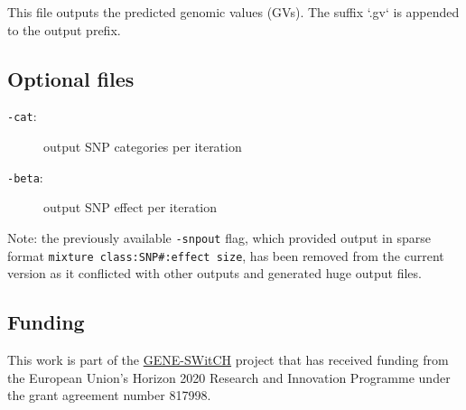 \documentclass{ol-softwaremanual}
\begin{document}
This file outputs the predicted genomic values (GVs). The suffix ‘.gv‘ is appended to the output prefix.

\subsection{Optional files}

\begin{description}
    \item[\texttt{-cat}:] output SNP categories per iteration 
    \item[\texttt{-beta}:] output SNP effect per iteration
\end{description}

Note: the previously available \texttt{-snpout} flag, which provided output in sparse format \texttt{mixture class:SNP\#:effect size}, has been removed from the current version as it conflicted with other outputs and generated huge output files.

\subsection{Funding}

This work is part of the \href{https://www.gene-switch.eu/}{GENE-SWitCH} project that has received funding from the European Union’s Horizon 2020 Research and
Innovation Programme under the grant agreement number 817998. 

%

\end{document}
